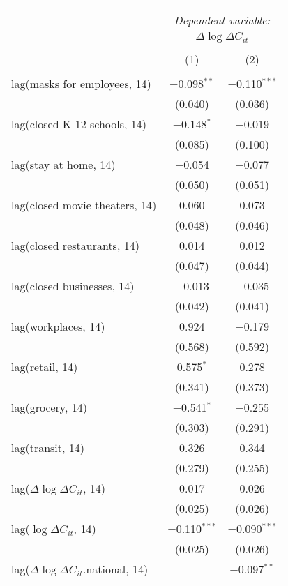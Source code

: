 \begin{tabular}{@{\extracolsep{1pt}}lcc} 
\\[-1.8ex]\hline 
\hline \\[-1.8ex] 
 & \multicolumn{2}{c}{\textit{Dependent variable:}} \\ 
\cline{2-3} 
 & \multicolumn{2}{c}{$\Delta \log \Delta C_{it}$} \\ 
\\[-1.8ex] & (1) & (2)\\ 
\hline \\[-1.8ex] 
 lag(masks for employees, 14) & $-$0.098$^{**}$ & $-$0.110$^{***}$ \\ 
  & (0.040) & (0.036) \\ 
  lag(closed K-12 schools, 14) & $-$0.148$^{*}$ & $-$0.019 \\ 
  & (0.085) & (0.100) \\ 
  lag(stay at home, 14) & $-$0.054 & $-$0.077 \\ 
  & (0.050) & (0.051) \\ 
  lag(closed movie theaters, 14) & 0.060 & 0.073 \\ 
  & (0.048) & (0.046) \\ 
  lag(closed restaurants, 14) & 0.014 & 0.012 \\ 
  & (0.047) & (0.044) \\ 
  lag(closed businesses, 14) & $-$0.013 & $-$0.035 \\ 
  & (0.042) & (0.041) \\ 
  lag(workplaces, 14) & 0.924 & $-$0.179 \\ 
  & (0.568) & (0.592) \\ 
  lag(retail, 14) & 0.575$^{*}$ & 0.278 \\ 
  & (0.341) & (0.373) \\ 
  lag(grocery, 14) & $-$0.541$^{*}$ & $-$0.255 \\ 
  & (0.303) & (0.291) \\ 
  lag(transit, 14) & 0.326 & 0.344 \\ 
  & (0.279) & (0.255) \\ 
  lag($\Delta \log \Delta C_{it}$, 14) & 0.017 & 0.026 \\ 
  & (0.025) & (0.026) \\ 
  lag($\log \Delta C_{it}$, 14) & $-$0.110$^{***}$ & $-$0.090$^{***}$ \\ 
  & (0.025) & (0.026) \\ 
  lag($\Delta \log \Delta C_{it}$.national, 14) &  & $-$0.097$^{**}$ \\ 

\end{tabular}

